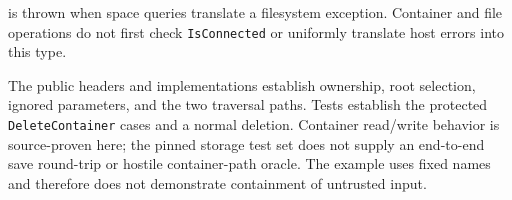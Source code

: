  is thrown when space queries translate a
filesystem exception. Container and file operations do not first check \texttt{IsConnected}
or uniformly translate host errors into this type.

The public headers and implementations establish ownership, root selection, ignored parameters,
and the two traversal paths. Tests establish the protected \texttt{DeleteContainer} cases and a
normal deletion. Container read/write behavior is source-proven here; the pinned storage test
set does not supply an end-to-end save round-trip or hostile container-path oracle. The example
uses fixed names and therefore does not demonstrate containment of untrusted input.
